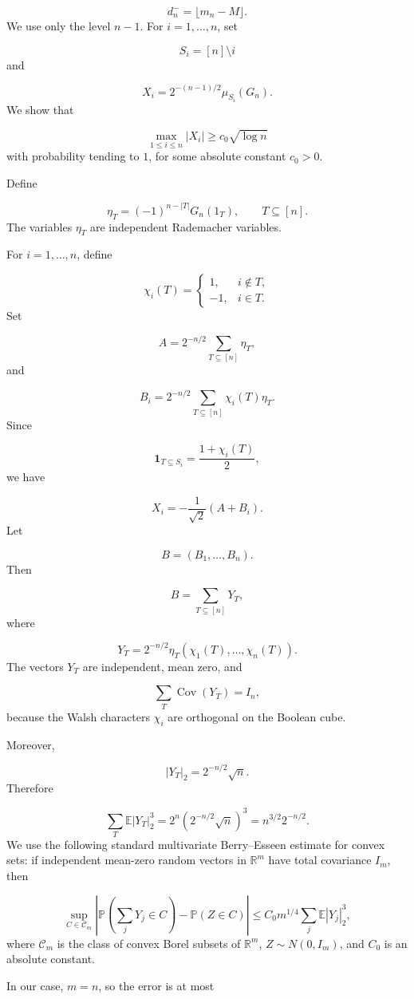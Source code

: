 \documentclass[11pt]{article}
\theoremstyle{definition}
\begin{document}
\[
d_n^-=\lfloor m_n-M\rfloor.
\]
We use only the level $n-1$. For $i=1,\dots,n$, set

\[
S_i=[n]\setminus{i}
\]
and

\[
X_i=2^{-(n-1)/2}\mu_{S_i}(G_n).
\]
We show that

\[
\max_{1\le i\le n}|X_i|\ge c_0\sqrt{\log n}
\]
with probability tending to $1$, for some absolute constant $c_0>0$.

Define

\[
\eta_T=(-1)^{n-|T|}G_n(1_T),
\qquad T\subseteq[n].
\]
The variables $\eta_T$ are independent Rademacher variables.

For $i=1,\dots,n$, define

\[
\chi_i(T)=
\begin{cases}
1,&i\notin T,\\
-1,&i\in T.
\end{cases}
\]
Set

\[
A=2^{-n/2}\sum_{T\subseteq[n]}\eta_T,
\]
and

\[
B_i=2^{-n/2}\sum_{T\subseteq[n]}\chi_i(T)\eta_T.
\]
Since

\[
\mathbf 1_{{T\subseteq S_i}}
=
\frac{1+\chi_i(T)}2,
\]
we have

\[
X_i=-\frac1{\sqrt2}(A+B_i).
\]
Let

\[
B=(B_1,\dots,B_n).
\]
Then

\[
B=\sum_{T\subseteq[n]}Y_T,
\]
where

\[
Y_T
=
2^{-n/2}\eta_T
(\chi_1(T),\dots,\chi_n(T)).
\]
The vectors $Y_T$ are independent, mean zero, and

\[
\sum_T\operatorname{Cov}(Y_T)=I_n,
\]
because the Walsh characters $\chi_i$ are orthogonal on the Boolean cube.

Moreover,

\[
|Y_T|_2=2^{-n/2}\sqrt n.
\]
Therefore

\[
\sum_T\mathbb{E}|Y_T|_2^3
=
2^n(2^{-n/2}\sqrt n)^3
=
n^{3/2}2^{-n/2}.
\]
We use the following standard multivariate Berry--Esseen estimate for convex sets: if independent mean-zero random vectors in $\mathbb{R}^m$ have total covariance $I_m$, then

\[
\sup_{C\in\mathcal C_m}
\left|
\mathbb{P}\left(\sum_j Y_j\in C\right)-\mathbb{P}(Z\in C)
\right|
\le
C_0 m^{1/4}\sum_j\mathbb{E}|Y_j|_2^3,
\]
where $\mathcal C_m$ is the class of convex Borel subsets of $\mathbb{R}^m$, $Z\sim N(0,I_m)$, and $C_0$ is an absolute constant.

In our case, $m=n$, so the error is at most
\end{document}
